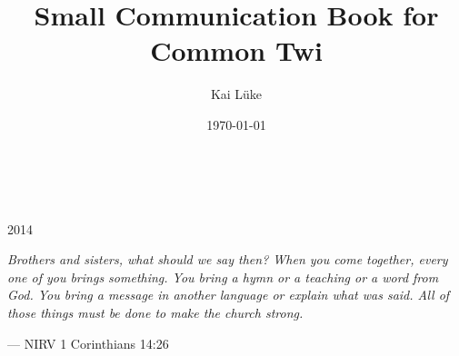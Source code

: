 \documentclass[%
 fontsize=11pt,%
 a5paper,pagesize,
 paper=a5,%
 DIV=9,%
 parskip=half*,%
 twoside=true,
 pointlessnumbers
]{scrbook}%
\title{Small Communication Book for Common Twi}
\author{Kai Lüke}
\date{\today}
\begin{document}
\begin{titlepage}
		\\

		\vspace{10mm}
		\\
		\vspace{\fill}
		\centering \large{2014}
\end{titlepage}

\newpage{}
\thispagestyle {empty}

\vspace*{2cm}

\begin{center}
	\Large{\parbox{10cm}{
		\begin{raggedright}
		{\Large 
			\textit{
			Brothers and sisters, what should we say then?
			When you come together, every one of you brings something.
			You bring a hymn or a teaching or a word from God.
			You bring a message in another language or explain what was said.
			All of those things must be done to make the church strong.
			}
		}

		\vspace{.5cm}\hfill{--- NIRV 1 Corinthians 14:26}
		\end{raggedright}
	}
}
\end{center}

\rmfamily{\tableofcontents}
\thispagestyle {empty}
\mainmatter
\end{document}
